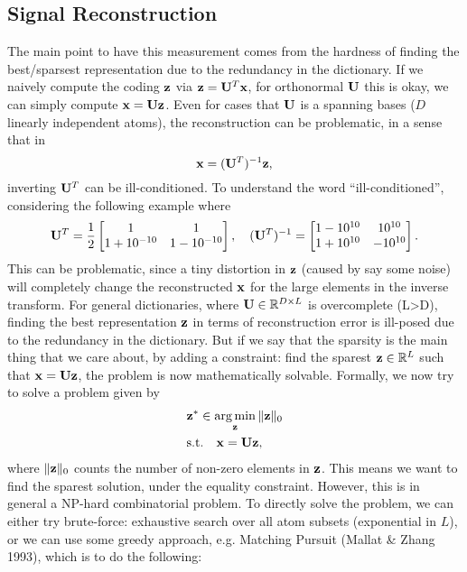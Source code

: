 \documentclass[../book-template.tex]{subfiles}
\begin{document}
\subsection{Signal Reconstruction}
The main point to have this measurement comes from the hardness of finding the best/sparsest representation due to the redundancy in the dictionary. If we naively compute the coding ${\bf z}$ via ${\bf z} = {\bf U}^T{\bf x}$, 
for orthonormal ${\bf U}$ this is okay, we can simply compute ${\bf x}={\bf Uz}$. Even for cases that ${\bf U}$ is a spanning bases ($D$ linearly independent atoms), the reconstruction can be problematic, in a sense that in
\begin{equation*}
	{\bf x} = ({\bf U}^T)^{-1}{\bf z},
\end{equation*}
inverting ${\bf U}^T$ can be ill-conditioned. To understand the word ``ill-conditioned'', considering the following example where
\begin{equation*}
	{\bf U}^T=\frac{1}{2}\begin{bmatrix}
	1&1\\
	1+10^{-10}&1-10^{-10}
	\end{bmatrix}
	,\quad ({\bf U}^T)^{-1}=\begin{bmatrix}
	1-10^{10}&10^{10}\\
	1+10^{10}&-10^{10}
	\end{bmatrix}.
\end{equation*}
This can be problematic, since a tiny distortion in ${\bf z}$ (caused by say some noise) will completely change the reconstructed ${\bf x}$ for the large elements in the inverse transform. For general dictionaries, where ${\bf U}\in\mathbb{R}^{D\times L}$ is overcomplete (L>D), finding the best representation ${\bf z}$ in terms of reconstruction error is ill-posed due to the redundancy in the dictionary. But if we say that the sparsity is the main thing that we care about, by adding a constraint: find the sparest ${\bf z}\in \mathbb{R}^L$ such that ${\bf x}={\bf Uz}$, the problem is now mathematically solvable. Formally, we now try to solve a problem given by
\begin{align}
	\label{eq_9_L0}&{\bf z}^*\in\mathop{\arg\min}_{\bf z}\|{\bf z}\|_0\\
	&{\rm s.t.}\quad {\bf x}={\bf Uz},\notag
\end{align}
where $\|{\bf z}\|_0$ counts the number of non-zero elements in ${\bf z}$. This means we want to find the sparest solution, under the equality constraint. However, this is in general a NP-hard combinatorial problem. To directly solve the problem, we can either try brute-force: exhaustive search over all atom subsets (exponential in $L$), or we can use some greedy approach, e.g. Matching Pursuit (Mallat \& Zhang 1993), which is to do the following:
\end{document}
